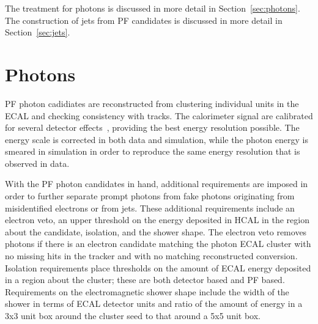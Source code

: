 The treatment for photons is discussed in more detail in Section~\ref{sec:photons}. The construction
of jets from PF candidates is discussed in more detail in Section~\ref{sec:jets}. 



\section{Photons\label{sec:photons}}

PF photon cadidiates are reconstructed from clustering individual units in the ECAL
and checking consistency with tracks.
The calorimeter signal are calibrated for several detector effects~\cite{CMS-PAS-EGM-10-005,ECALpaper},
providing the best energy resolution possible.
The energy scale is corrected in both data and simulation, while the photon energy is smeared in
simulation in order to reproduce the same energy resolution that is observed in data.

With the PF photon candidates in hand, additional requirements are imposed in order to further
separate prompt photons from fake photons originating from misidentified electrons or from jets.
These additional requirements include an electron veto, an upper threshold on the energy deposited
in HCAL in the region about the candidate, isolation, and the shower shape. The electron veto 
removes photons if there is an electron candidate matching the photon ECAL cluster with no missing
hits in the tracker and with no matching reconstructed conversion.
Isolation requirements place
thresholds on the amount of ECAL energy deposited in a region about the cluster; these are both
detector based and PF based. Requirements on the electromagnetic shower shape include the
width of the shower in terms of ECAL detector units and
ratio of the amount of energy in a 3x3 unit box around the cluster seed to that around a 5x5 unit box.

